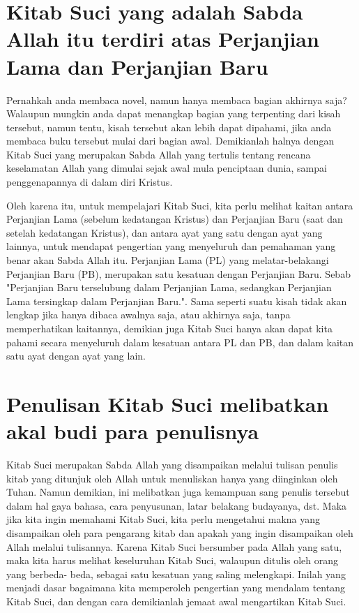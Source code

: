 \section*{Kitab Suci yang adalah Sabda Allah itu terdiri atas Perjanjian Lama dan Perjanjian Baru}
Pernahkah anda membaca novel, namun hanya membaca bagian akhirnya saja? Walaupun mungkin anda dapat menangkap bagian yang terpenting dari kisah tersebut, namun tentu, kisah tersebut akan lebih dapat dipahami, jika anda membaca buku tersebut mulai dari bagian awal. Demikianlah halnya dengan Kitab Suci yang merupakan Sabda Allah yang tertulis tentang rencana keselamatan Allah yang dimulai sejak awal mula penciptaan dunia, sampai penggenapannya di dalam diri Kristus.

Oleh karena itu, untuk mempelajari Kitab Suci, kita perlu melihat kaitan antara Perjanjian Lama (sebelum kedatangan Kristus) dan Perjanjian Baru (saat dan setelah kedatangan Kristus), dan antara ayat yang satu dengan ayat yang lainnya, untuk mendapat pengertian yang menyeluruh dan pemahaman yang benar akan Sabda Allah itu. Perjanjian Lama (PL) yang melatar-belakangi Perjanjian Baru (PB), merupakan satu kesatuan dengan Perjanjian Baru. Sebab "Perjanjian Baru terselubung dalam Perjanjian Lama, sedangkan Perjanjian Lama tersingkap dalam Perjanjian Baru.". Sama seperti suatu kisah tidak akan lengkap jika hanya dibaca awalnya saja, atau akhirnya saja, tanpa memperhatikan kaitannya, demikian juga Kitab Suci hanya akan dapat kita pahami secara menyeluruh dalam kesatuan antara PL dan PB, dan dalam kaitan satu ayat dengan ayat yang lain.

\section*{Penulisan Kitab Suci melibatkan akal budi para penulisnya}
Kitab Suci merupakan Sabda Allah yang disampaikan melalui tulisan penulis kitab yang ditunjuk oleh Allah untuk menuliskan hanya yang diinginkan oleh Tuhan. Namun demikian, ini melibatkan juga kemampuan sang penulis tersebut dalam hal gaya bahasa, cara penyusunan, latar belakang budayanya, dst. Maka jika kita ingin memahami Kitab Suci, kita perlu mengetahui makna yang disampaikan oleh para pengarang kitab dan apakah yang ingin disampaikan oleh Allah melalui tulisannya. Karena Kitab Suci bersumber pada Allah yang satu, maka kita harus melihat keseluruhan Kitab Suci, walaupun ditulis oleh orang yang berbeda- beda, sebagai satu kesatuan yang saling melengkapi. Inilah yang menjadi dasar bagaimana kita memperoleh pengertian yang mendalam tentang Kitab Suci, dan dengan cara demikianlah jemaat awal mengartikan Kitab Suci.


